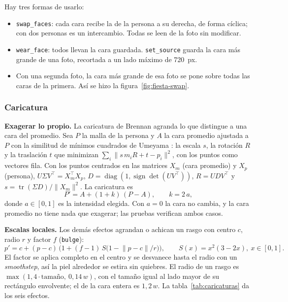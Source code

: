 Hay tres formas de usarlo:
\begin{itemize}
  \item \texttt{swap\_faces}: cada cara recibe la de la persona a su derecha, de forma cíclica; con dos personas es un intercambio. Todas se leen de la foto sin modificar.
  \item \texttt{wear\_face}: todos llevan la cara guardada. \texttt{set\_source} guarda la cara más grande de una foto, recortada a un lado máximo de 720~px.
  \item Con una segunda foto, la cara más grande de esa foto se pone sobre todas las caras de la primera. Así se hizo la figura~\ref{fig:fiesta-swap}.
\end{itemize}

\subsubsection{Caricatura}

\textbf{Exagerar lo propio.} La caricatura de Brennan \cite{brennan1985} agranda lo que distingue a una cara del promedio. Sea $P$ la malla de la persona y $A$ la cara promedio ajustada a $P$ con la similitud de mínimos cuadrados de Umeyama \cite{umeyama1991}: la escala $s$, la rotación $R$ y la traslación $t$ que minimizan $\sum_i\lVert s\,m_iR+t-p_i\rVert^2$, con los puntos como vectores fila. Con los puntos centrados en las matrices $X_m$ (cara promedio) y $X_p$ (persona), $U\Sigma V^\top=X_m^\top X_p$, $D=\operatorname{diag}(1,\operatorname{sign}\det(UV^\top))$, $R=UDV^\top$ y $s=\operatorname{tr}(\Sigma D)/\lVert X_m\rVert^2$. La caricatura es
\begin{equation}
  P'=A+(1+k)\,(P-A),\qquad k=2\,a,
\end{equation}
donde $a\in[0,1]$ es la intensidad elegida. Con $a=0$ la cara no cambia, y la cara promedio no tiene nada que exagerar; las pruebas verifican ambos casos.

\textbf{Escalas locales.} Los demás efectos agrandan o achican un rasgo con centro $c$, radio $r$ y factor $f$ (\texttt{bulge}):
\begin{equation}
  p'=c+(p-c)\,\Big(1+(f-1)\,S\big(1-\lVert p-c\rVert/r\big)\Big),\qquad S(x)=x^2(3-2x),\ x\in[0,1].
\end{equation}
El factor se aplica completo en el centro y se desvanece hasta el radio con un \emph{smoothstep}, así la piel alrededor se estira sin quiebres. El radio de un rasgo es $\max(1{,}4\cdot\text{tamaño},\ 0{,}14\,w)$, con el tamaño igual al lado mayor de su rectángulo envolvente; el de la cara entera es $1{,}2\,w$. La tabla~\ref{tab:caricaturas} da los seis efectos.

